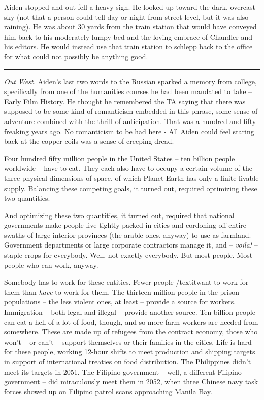\documentclass[11pt]{book}
\begin{document}
	Aiden stopped and out fell a heavy sigh. He looked up toward the dark, overcast sky (not that a person could tell day or night from street level, but it was also raining). He was about 30 yards from the train station that would have conveyed him back to his moderately lumpy bed and the loving embrace of Chandler and his editors. He would instead use that train station to schlepp back to the office for what could not possibly be anything good.
	
	\vspace{0.5cm}
	\hrule
	\vspace{0.5cm}
	
	\textit{Out West.} Aiden's last two words to the Russian sparked a memory from college, specifically from one of the humanities courses he had been mandated to take -- Early Film History. He thought he remembered the TA saying that there was supposed to be some kind of romanticism embedded in this phrase, some sense of adventure combined with the thrill of anticipation. That was a hundred and fifty freaking years ago. No romanticism to be had here - All Aiden could feel staring back at the copper coils was a sense of creeping dread.
	
	Four hundred fifty million people in the United States -- ten billion people worldwide -- have to eat. They each also have to occupy a certain volume of the three physical dimensions of space, of which Planet Earth has only a finite livable supply. Balancing these competing goals, it turned out, required optimizing these two quantities.
	
	And optimizing these two quantities, it turned out, required that national governments make people live tightly-packed in cities and cordoning off entire swaths of large interior provinces (the arable ones, anyway) to use as farmland. Government departments or large corporate contractors manage it, and -- \textit{voila!} -- staple crops for everybody. Well, not exactly everybody. But most people. Most people who can work, anyway.
	
	Somebody has to work for these entities. Fewer people /textit{want} to work for them than \textit{have} to work for them. The thirteen million people in the prison populations -- the less violent ones, at least -- provide a source for workers. Immigration -- both legal and illegal -- provide another source. Ten billion people can eat a hell of a lot of food, though, and so more farm workers are needed from somewhere. These are made up of refugees from the contract economy, those who won't -- or can't -- support themselves or their families in the cities. Life is hard for these people, working 12-hour shifts to meet production and shipping targets in support of international treaties on food distribution. The Philippines didn't meet its targets in 2051. The Filipino government -- well, a different Filipino government -- did miraculously meet them in 2052, when three Chinese navy task forces showed up on Filipino patrol scans approaching Manila Bay.
	
\end{document}
